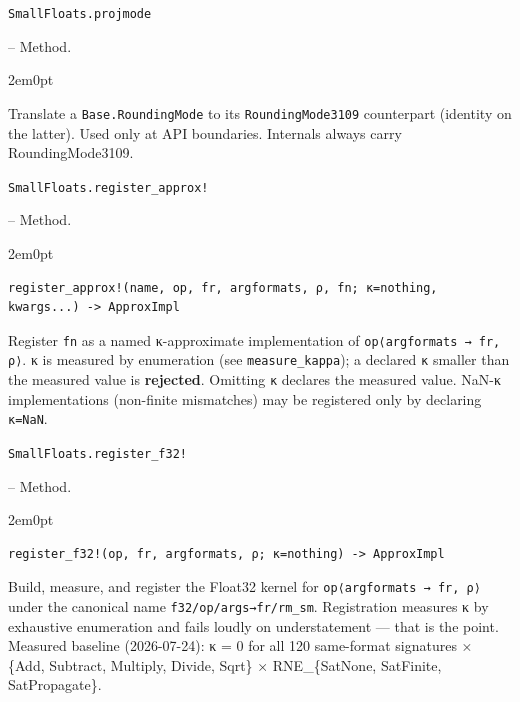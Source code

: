 \par\medskip\noindent\begin{minipage}{\linewidth}
\hypertarget{11630420834157853592}{\texttt{SmallFloats.projmode}}  -- {Method.}
\nopagebreak
\begin{adjustwidth}{2em}{0pt}

Translate a \texttt{Base.RoundingMode} to its \texttt{RoundingMode3109} counterpart (identity on the latter). Used only at API boundaries. Internals always carry RoundingMode3109.



\end{adjustwidth}
\end{minipage}
\par\medskip

\par\medskip\noindent\begin{minipage}{\linewidth}
\hypertarget{852197704347416372}{\texttt{SmallFloats.register\_\allowbreak{}approx!}}  -- {Method.}
\nopagebreak
\begin{adjustwidth}{2em}{0pt}


\begin{verbatim}
register_approx!(name, op, fr, argformats, ρ, fn; κ=nothing, kwargs...) -> ApproxImpl
\end{verbatim}

Register \texttt{fn} as a named κ-approximate implementation of \texttt{op⟨argformats → fr, ρ⟩}. κ is measured by enumeration (see \texttt{measure\_\allowbreak{}kappa}); a declared \texttt{κ} smaller than the measured value is \textbf{rejected}. Omitting \texttt{κ} declares the measured value. NaN-κ implementations (non-finite mismatches) may be registered only by declaring \texttt{κ=NaN}.



\end{adjustwidth}
\end{minipage}
\par\medskip

\par\medskip\noindent\begin{minipage}{\linewidth}
\hypertarget{15760383384433593536}{\texttt{SmallFloats.register\_\allowbreak{}f32!}}  -- {Method.}
\nopagebreak
\begin{adjustwidth}{2em}{0pt}


\begin{verbatim}
register_f32!(op, fr, argformats, ρ; κ=nothing) -> ApproxImpl
\end{verbatim}

Build, measure, and register the Float32 kernel for \texttt{op⟨argformats → fr, ρ⟩} under the canonical name \texttt{f32/op/args→fr/rm\_\allowbreak{}sm}. Registration measures κ by exhaustive enumeration and fails loudly on understatement — that is the point. Measured baseline (2026-07-24): κ = 0 for all 120 same-format signatures × \{Add, Subtract, Multiply, Divide, Sqrt\} × RNE\_\allowbreak{}\{SatNone, SatFinite, SatPropagate\}.



\end{adjustwidth}
\end{minipage}
\par\medskip

